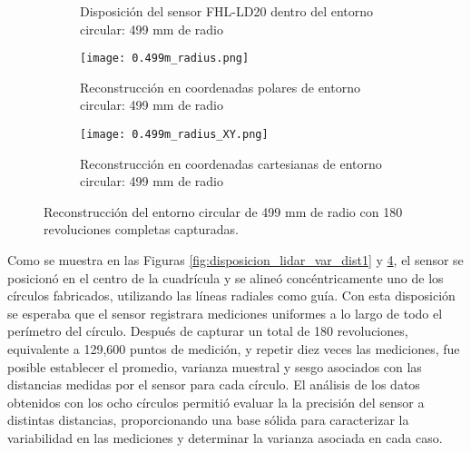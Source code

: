 \begin{figure}[H]
	\centering
	\begin{subfigure}{\textwidth}
		\centering
		\caption{Disposición del sensor FHL-LD20 dentro del entorno circular: 499 mm de radio}
		\label{fig:disposicion_lidar_var8}
		\vspace{1em}
	\end{subfigure}
	\begin{subfigure}{0.45\textwidth}
		\centering
		\texttt{[image: 0.499m\_radius.png]}
		\caption{Reconstrucción en coordenadas polares de entorno circular: 499 mm de radio}
		\label{fig:499m_radius_xy}
	\end{subfigure}
	\hspace{1em}
	\begin{subfigure}{0.45\textwidth}
		\centering
		\texttt{[image: 0.499m\_radius\_XY.png]}
		\caption{Reconstrucción en coordenadas cartesianas de entorno circular: 499 mm de radio}
		\label{fig:499m_radius}
	\end{subfigure}
	\caption{Reconstrucción del entorno circular de 499 mm de radio con 180 revoluciones completas capturadas.}
	\label{fig:disposicion_lidar_var_dist8}
\end{figure}

Como se muestra en las Figuras \ref{fig:disposicion_lidar_var_dist1} y \ref{fig:disposicion_lidar_var_dist8}, el sensor se posicionó en el centro de la cuadrícula y se alineó concéntricamente uno de los círculos fabricados, utilizando las líneas radiales como guía. Con esta disposición se esperaba que el sensor registrara mediciones uniformes a lo largo de todo el perímetro del círculo. Después de capturar un total de 180 revoluciones, equivalente a 129,600 puntos de medición, y repetir diez veces las mediciones, fue posible establecer el promedio, varianza muestral y sesgo asociados con las distancias medidas por el sensor para cada círculo. El análisis de los datos obtenidos con los ocho círculos permitió evaluar la la precisión del sensor a distintas distancias, proporcionando una base sólida para caracterizar la variabilidad en las mediciones y determinar la varianza asociada en cada caso.

